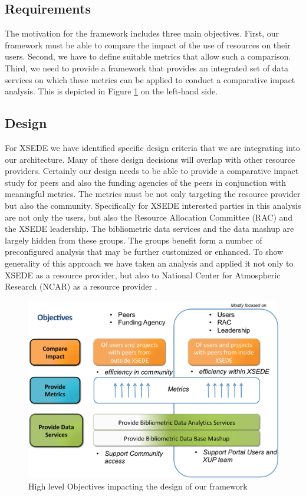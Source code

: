 \documentclass[10pt, conference, compsocconf]{IEEEtran}
\begin{document}
\subsection{Requirements}

The motivation for the framework includes three main objectives.  First, our framework must be able to compare the impact of the use of resources on their users. Second, we have to define suitable metrics that allow such a comparison. Third, we need to provide a framework that provides an integrated set of data services on which these metrics can be applied to conduct a comparative impact analysis. This is depicted in Figure \ref{F:objectives} on the left-hand side.

\subsection{Design}


For XSEDE we have identified specific design criteria that we are integrating into our architecture. Many of these design decisions will overlap with other resource providers. Certainly our design needs to be able to provide a comparative impact study for peers and also the funding agencies of the peers in conjunction with meaningful metrics. The metrics must be not only targeting the resource provider but also the community. Specifically for XSEDE interested parties in this analysis are not only the users, but also the Resource Allocation Committee (RAC) and the XSEDE leadership. The bibliometric data services and the data mashup are largely hidden from these groups. The groups benefit form a number of preconfigured analysis that may be further customized or enhanced. To show generality of this approach we have taken an analysis and applied it not only to XSEDE as a resource provider, but also to National Center for Atmospheric Research (NCAR) as a resource provider \cite{www-ncar}.



\begin{figure}[htb] 
  \centering 
    \includegraphics[width=1.0\columnwidth]{images-new/objectives.pdf} 
    \caption{High level Objectives impacting the design of our framework}
    \label{F:objectives}
\end{figure} 
\end{document}
